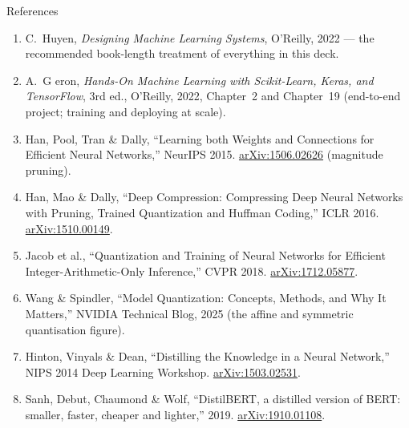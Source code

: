 \begin{frame}[allowframebreaks]{References}
\begin{enumerate}
    \item C.~Huyen, \textit{Designing Machine Learning Systems}, O'Reilly, 2022 --- the recommended
          book-length treatment of everything in this deck.
    \item A.~G eron, \textit{Hands-On Machine Learning with Scikit-Learn, Keras, and TensorFlow},
          3rd ed., O'Reilly, 2022, Chapter~2 and Chapter~19 (end-to-end project; training and deploying at
          scale).

    \item Han, Pool, Tran \& Dally, ``Learning both Weights and Connections for Efficient Neural
          Networks,'' NeurIPS 2015. \href{https://arxiv.org/abs/1506.02626}{arXiv:1506.02626} (magnitude pruning).
    \item Han, Mao \& Dally, ``Deep Compression: Compressing Deep Neural Networks with Pruning, Trained
          Quantization and Huffman Coding,'' ICLR 2016. \href{https://arxiv.org/abs/1510.00149}{arXiv:1510.00149}.
    \item Jacob et al., ``Quantization and Training of Neural Networks for Efficient
          Integer-Arithmetic-Only Inference,'' CVPR 2018. \href{https://arxiv.org/abs/1712.05877}{arXiv:1712.05877}.
    \item Wang \& Spindler, ``Model Quantization: Concepts, Methods, and Why It Matters,'' NVIDIA
          Technical Blog, 2025 (the affine and symmetric quantisation figure).
    \item Hinton, Vinyals \& Dean, ``Distilling the Knowledge in a Neural Network,'' NIPS 2014 Deep
          Learning Workshop. \href{https://arxiv.org/abs/1503.02531}{arXiv:1503.02531}.
    \item Sanh, Debut, Chaumond \& Wolf, ``DistilBERT, a distilled version of BERT: smaller, faster,
          cheaper and lighter,'' 2019. \href{https://arxiv.org/abs/1910.01108}{arXiv:1910.01108}.
  \end{enumerate}
\end{frame}
